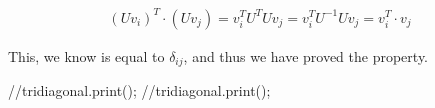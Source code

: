 \documentclass[english,notitlepage]{revtex4-1}  %
\begin{document}
\begin{align*}
\left(U v_i \right)^T \cdot (U v_j) = v_i^T U^T U v_j = v_i^T U^{-1} U v_j = v_i^T \cdot v_j
\end{align*}

This, we know is equal to $\delta_{ij}$, and thus we have proved the property.



    //tridiagonal.print();    //tridiagonal.print();%

\end{document}
